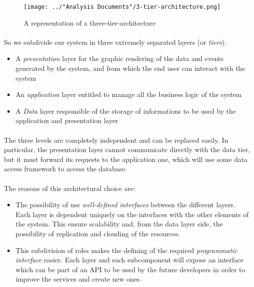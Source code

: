 \begin{figure}[H]
	\centering
	\texttt{[image: ../"Analysis Documents"/3-tier-architecture.png]}
	\caption{A representation of a three-tier-architecture}
	\label{fig:3-tier-architecture}
\end{figure}
\paragraph{} So we subdivide our system in three extremely separated layers (or \textit{tiers}):
\begin{itemize}
	\item A \textit{presentation} layer for the graphic rendering of the data and events generated by the system, and from which the end user can interact with the system
	\item An \textit{application} layer entitled to manage all the business logic of the system
	\item A \textit{Data} layer responsible of the storage of informations to be used by the application and presentation layer
\end{itemize}
\paragraph{}The three levels are completely independent and can be replaced easily. In particular, the presentation layer cannot communicate directly with the data tier, but it must forward its requests to the application one, which will use some data access framework to access the database.
\paragraph{} The reasons of this architectural choice are:
\begin{itemize}
	\item The possibility of use \textit{well-defined interfaces} between the different layers. Each layer is dependent uniquely on the interfaces with the other elements of the system. This ensure scalability and, from the data layer side, the possibility of replication and clouding of the resources.
	\item This subdivision of roles makes the defining of the required \textit{programmatic interface} easier. Each layer and each subcomponent will expose an interface which can be part of an API to be used by the future developers in order to improve the services and create new ones.
\end{itemize}


